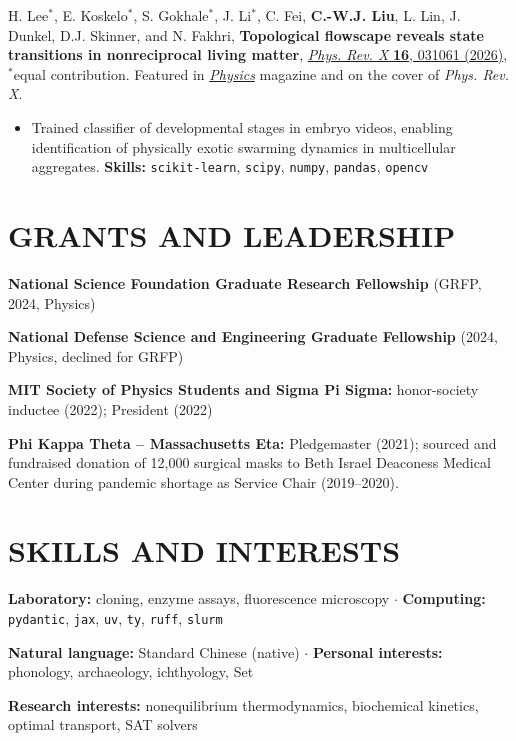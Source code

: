 \documentclass[11pt,letterpaper]{article}
\newcommand{\publication}[1]{#1\par}
\newcommand{\projectsep}{\par\vspace{2pt}}
\begin{document}
\projectsep
\publication{H. Lee$^*$, E. Koskelo$^*$, S. Gokhale$^*$, J. Li$^*$, C. Fei, \textbf{C.-W.J. Liu}, L. Lin, J. Dunkel, D.J. Skinner, and N. Fakhri, \textbf{Topological flowscape reveals state transitions in nonreciprocal living matter}, \href{https://doi.org/10.1103/tq6h-f5ws}{\textit{Phys. Rev. X} \textbf{16}, 031061 (2026)}, $^*$equal contribution. Featured in \href{https://physics.aps.org/articles/v19/115}{\textit{Physics}} magazine and on the cover of \textit{Phys. Rev. X}.}
\begin{itemize}
\item Trained classifier of developmental stages in embryo videos, enabling identification of physically exotic swarming dynamics in multicellular aggregates.
\textbf{Skills:} \texttt{scikit-learn}, \texttt{scipy}, \texttt{numpy}, \texttt{pandas}, \texttt{opencv}
\end{itemize}

\section{GRANTS AND LEADERSHIP}
\begingroup\setlength{\parskip}{1pt}
\textbf{National Science Foundation Graduate Research Fellowship} (GRFP, 2024, Physics)\par
\textbf{National Defense Science and Engineering Graduate Fellowship} (2024, Physics, declined for GRFP)\par
\textbf{MIT Society of Physics Students and Sigma Pi Sigma:} honor-society inductee (2022); President (2022)\par
\textbf{Phi Kappa Theta -- Massachusetts Eta:} Pledgemaster (2021); sourced and fundraised donation of 12,000 surgical masks to Beth Israel Deaconess Medical Center during pandemic shortage as Service Chair (2019--2020).
\par\endgroup

\section{SKILLS AND INTERESTS}
\textbf{Laboratory:} cloning, enzyme assays, fluorescence microscopy $\cdot$ \textbf{Computing:} \texttt{pydantic}, \texttt{jax}, \texttt{uv}, \texttt{ty}, \texttt{ruff}, \texttt{slurm}\par
\textbf{Natural language:} Standard Chinese (native) $\cdot$ \textbf{Personal interests:} phonology, archaeology, ichthyology, Set\par
\textbf{Research interests:} nonequilibrium thermodynamics, biochemical kinetics, optimal transport, SAT solvers\par
\end{document}
